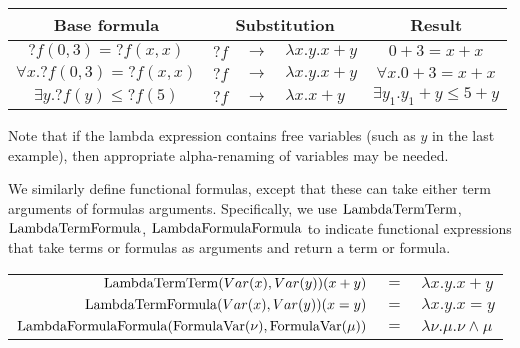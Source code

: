 \begin{ex}
  \begin{center}
    \begin{tabular}{|c|r c l|c|}
      \hline
      Base formula                     & \multicolumn{3}{c|}{Substitution} & Result                                                             \\
      \hline
      $?f(0, 3) = ?f(x, x)$            & $?f$                              & $\rightarrow$ & $\lambda x.y. x+y$ & $0+3 = x+x$                   \\
      $\forall x. ?f(0, 3) = ?f(x, x)$ & $?f$                              & $\rightarrow$ & $\lambda x.y. x+y$ & $\forall x. 0+3 = x+x$        \\

      $\exists y. ?f(y) \leq ?f(5)$    & $?f$                              & $\rightarrow$ & $\lambda x. x+y$   & $\exists y_1. y_1+y \leq 5+y$ \\

      \hline
    \end{tabular}
  \end{center}
\end{ex}
Note that if the lambda expression contains free variables (such as $y$ in the last example), then appropriate alpha-renaming of variables may be needed.


We similarly define functional formulas, except that these can take either term arguments of formulas arguments. Specifically, we use $\operatorname{LambdaTermTerm}$, $\operatorname{LambdaTermFormula}$, $\operatorname{LambdaFormulaFormula}$ to indicate functional expressions that take terms or formulas as arguments and return a term or formula.

\begin{ex}
  \begin{center}
    \begin{tabular}{|r c l|}
      \hline
      $\operatorname{LambdaTermTerm}(Var(x), Var(y))(x+y)$                & $=$ & $\lambda x.y. x+y$               \\
      $\operatorname{LambdaTermFormula}(Var(x), Var(y))(x=y)$                & $=$ & $\lambda x.y. x=y$               \\
      $\operatorname{LambdaFormulaFormula}(\operatorname{FormulaVar}(\nu), \operatorname{FormulaVar}(\mu))$ & $=$ & $\lambda \nu.\mu. \nu \land \mu$ \\
      \hline
    \end{tabular}
  \end{center}

\end{ex}

